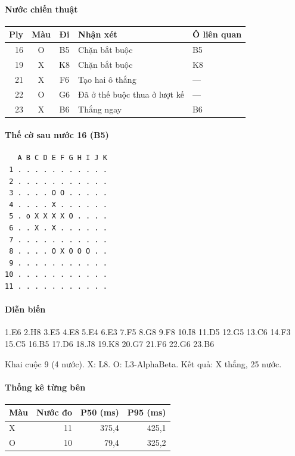 \paragraph{Nước chiến thuật}
\begin{center}\small
\begin{tabular}{@{}rccll@{}}
\toprule
Ply & Màu & Đi & Nhận xét & Ô liên quan \\
\midrule
16 & O & B5 & Chặn bắt buộc & B5 \\
19 & X & K8 & Chặn bắt buộc & K8 \\
21 & X & F6 & Tạo hai ô thắng & — \\
22 & O & G6 & Đã ở thế buộc thua ở lượt kế & — \\
23 & X & B6 & Thắng ngay & B6 \\
\bottomrule
\end{tabular}
\end{center}
\paragraph{Thế cờ sau nước 16 (B5)}
\begin{verbatim}
   A B C D E F G H I J K
 1 . . . . . . . . . . .
 2 . . . . . . . . . . .
 3 . . . . O O . . . . .
 4 . . . . X . . . . . .
 5 . o X X X X O . . . .
 6 . . X . X . . . . . .
 7 . . . . . . . . . . .
 8 . . . . O X O O O . .
 9 . . . . . . . . . . .
10 . . . . . . . . . . .
11 . . . . . . . . . . .
\end{verbatim}
\paragraph{Diễn biến}
{\footnotesize 1.E6 2.H8 3.E5 4.E8 5.E4 6.E3 7.F5 8.G8 9.F8 10.I8 11.D5 12.G5 13.C6 14.F3 15.C5 16.B5 17.D6 18.J8 19.K8 20.G7 21.F6 22.G6 23.B6\par}
Khai cuộc 9 (4 nước). X: L8. O: L3-AlphaBeta. Kết quả: X thắng, 25 nước.
\paragraph{Thống kê từng bên}
\begin{center}\small
\begin{tabular}{@{}lrrr@{}}
\toprule
Màu & Nước đo & P50 (ms) & P95 (ms) \\
\midrule
X & 11 & 375,4 & 425,1 \\
O & 10 & 79,4 & 325,2 \\
\bottomrule
\end{tabular}
\end{center}

